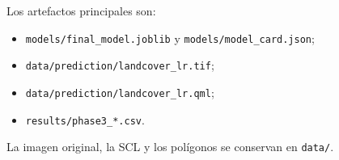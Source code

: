 \documentclass{article}
\begin{document}
Los artefactos principales son:
\begin{itemize}
 \item \texttt{models/final\_model.joblib} y \texttt{models/model\_card.json};
 \item \texttt{data/prediction/landcover\_lr.tif};
 \item \texttt{data/prediction/landcover\_lr.qml};
 \item \texttt{results/phase3\_*.csv}.
\end{itemize}
La imagen original, la SCL y los polígonos se conservan en \texttt{data/}.

\printbibliography
\end{document}
